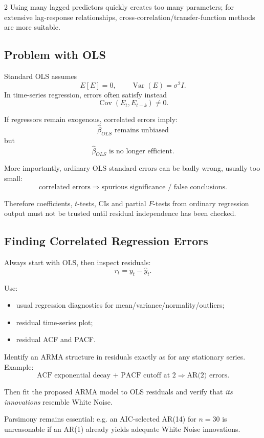 \documentclass[9pt,a4paper]{extarticle}
\begin{document}
\begin{multicols}{2}
Using many lagged predictors quickly creates too many parameters; for extensive lag-response relationships, cross-correlation/transfer-function methods are more suitable.

\subsection{Problem with OLS}

Standard OLS assumes
\[
E[E]=0,\qquad
\operatorname{Var}(E)=\sigma^2I.
\]
In time-series regression, errors often satisfy instead
\[
\operatorname{Cov}(E_t,E_{t-k})\neq0.
\]

If regressors remain exogenous, correlated errors imply:
\[
\boxed{\widehat\beta_{OLS}\text{ remains unbiased}}
\]
but
\[
\boxed{\widehat\beta_{OLS}\text{ is no longer efficient}.}
\]

More importantly, ordinary OLS standard errors can be badly wrong, usually too small:
\[
\boxed{\text{correlated errors}\Rightarrow
\text{spurious significance / false conclusions}.}
\]

Therefore coefficients, \(t\)-tests, CIs and partial \(F\)-tests from ordinary regression output must not be trusted until residual independence has been checked.

\subsection{Finding Correlated Regression Errors}

Always start with OLS, then inspect residuals:
\[
r_t=y_t-\widehat y_t.
\]

Use:
\begin{itemize}
\item usual regression diagnostics for mean/variance/normality/outliers;
\item residual time-series plot;
\item residual ACF and PACF.
\end{itemize}

Identify an ARMA structure in residuals exactly as for any stationary series. Example:
\[
\text{ACF exponential decay + PACF cutoff at 2}
\Rightarrow
\text{AR(2) errors}.
\]

Then fit the proposed ARMA model to OLS residuals and verify that \emph{its innovations} resemble White Noise.

Parsimony remains essential: e.g. an AIC-selected AR(14) for \(n=30\) is unreasonable if an AR(1) already yields adequate White Noise innovations.


\end{multicols}
\end{document}
